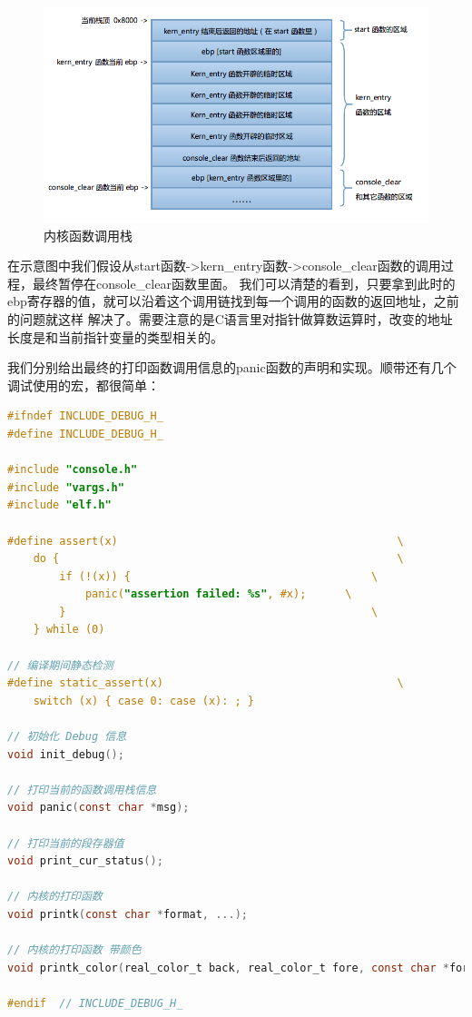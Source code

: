 \begin{figure}[ht]
      \centering
      \includegraphics[scale=0.55]{picture/chapt5/os_function_stack.png}
      \caption{内核函数调用栈}
\end{figure}

\par 在示意图中我们假设从start函数->kern\_entry函数->console\_clear函数的调用过程，最终暂停在console\_clear函数里面。\allowbreak
我们可以清楚的看到，只要拿到此时的ebp寄存器的值，就可以沿着这个调用链找到每一个调用的函数的返回地址，之前的问题就这样\allowbreak
解决了。需要注意的是C语言里对指针做算数运算时，改变的地址长度是和当前指针变量的类型相关的。

\par 我们分别给出最终的打印函数调用信息的panic函数的声明和实现。顺带还有几个调试使用的宏，都很简单：

\begin{lstlisting}[language = C, label = include/debug.h, caption = debug/debug.h]
#ifndef INCLUDE_DEBUG_H_
#define INCLUDE_DEBUG_H_

#include "console.h"
#include "vargs.h"
#include "elf.h"

#define assert(x)                                       	\
	do {                                                	\
		if (!(x)) {                                     \
			panic("assertion failed: %s", #x);      \
		}                                               \
	} while (0)

// 编译期间静态检测
#define static_assert(x)                                	\
	switch (x) { case 0: case (x): ; }

// 初始化 Debug 信息
void init_debug();

// 打印当前的函数调用栈信息
void panic(const char *msg);

// 打印当前的段存器值
void print_cur_status();

// 内核的打印函数
void printk(const char *format, ...);

// 内核的打印函数 带颜色
void printk_color(real_color_t back, real_color_t fore, const char *format, ...);

#endif 	// INCLUDE_DEBUG_H_
\end{lstlisting}

